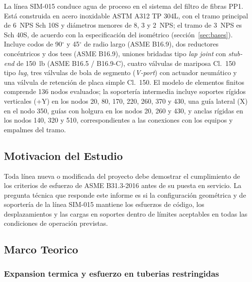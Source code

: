 La l\'{i}nea SIM-015 conduce agua de proceso en el sistema del filtro de
fibras PP1. Est\'{a} construida en acero inoxidable ASTM A312 TP 304L, con el
tramo principal de 6~NPS Sch 10S y di\'{a}metros menores de 8, 3 y 2~NPS; el
tramo de 3~NPS es Sch 40S, de acuerdo con la especificaci\'{o}n del
isom\'{e}trico (secci\'{o}n~\ref{sec:bases}). Incluye codos de 90$^\circ$ y
45$^\circ$ de radio largo (ASME B16.9), dos reductores conc\'{e}ntricos y dos
tees (ASME B16.9), uniones bridadas tipo \textit{lap joint} con
\textit{stub-end} de 150~lb (ASME B16.5 / B16.9-C), cuatro v\'{a}lvulas de
mariposa Cl.~150 tipo \textit{lug}, tres v\'{a}lvulas de bola de segmento
(\textit{V-port}) con actuador neum\'{a}tico y una v\'{a}lvula de retenci\'{o}n
de placa simple Cl.~150.
El modelo de elementos finitos comprende 136 nodos
evaluados; la soporter\'{i}a intermedia incluye soportes r\'{i}gidos verticales
(+Y) en los nodos 20, 80, 170, 220, 260, 370 y 430, una gu\'{i}a lateral (X) en
el nodo 350, gu\'{i}as con holgura en los nodos 20, 260 y 430, y anclas
r\'{i}gidas en los nodos 140, 320 y 510, correspondientes a las conexiones con
los equipos y empalmes del tramo.

\subsection{Motivacion del Estudio}

Toda l\'{i}nea nueva o modificada del proyecto debe demostrar el cumplimiento de
los criterios de esfuerzo de ASME B31.3-2016 antes de su puesta en servicio.
La pregunta t\'{e}cnica que responde este informe es si la configuraci\'{o}n
geom\'{e}trica y de soporter\'{i}a de la l\'{i}nea SIM-015 mantiene los esfuerzos
de c\'{o}digo, los desplazamientos y las cargas en soportes dentro de l\'{i}mites
aceptables en todas las condiciones de operaci\'{o}n previstas.

\subsection{Marco Teorico}
\label{ssec:marco}

\subsubsection{Expansion termica y esfuerzo en tuberias restringidas}

